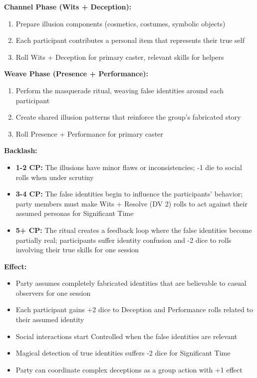 \documentclass[12pt,twoside]{book}
\begin{document}
\textbf{Channel Phase (Wits + Deception):}
\begin{enumerate}
\item Prepare illusion components (cosmetics, costumes, symbolic objects)
\item Each participant contributes a personal item that represents their true self
\item Roll Wits + Deception for primary caster, relevant skills for helpers
\end{enumerate}

\textbf{Weave Phase (Presence + Performance):}
\begin{enumerate}
\item Perform the masquerade ritual, weaving false identities around each participant
\item Create shared illusion patterns that reinforce the group's fabricated story
\item Roll Presence + Performance for primary caster
\end{enumerate}

\textbf{Backlash:}
\begin{itemize}
\item \textbf{1-2 CP:} The illusions have minor flaws or inconsistencies; -1 die to social rolls when under scrutiny
\item \textbf{3-4 CP:} The false identities begin to influence the participants' behavior; party members must make Wits + Resolve (DV 2) rolls to act against their assumed personas for Significant Time
\item \textbf{5+ CP:} The ritual creates a feedback loop where the false identities become partially real; participants suffer identity confusion and -2 dice to rolls involving their true skills for one session
\end{itemize}

\textbf{Effect:}
\begin{itemize}
\item Party assumes completely fabricated identities that are believable to casual observers for one session
\item Each participant gains +2 dice to Deception and Performance rolls related to their assumed identity
\item Social interactions start Controlled when the false identities are relevant
\item Magical detection of true identities suffers -2 dice for Significant Time
\item Party can coordinate complex deceptions as a group action with +1 effect
\end{itemize}
\end{document}

